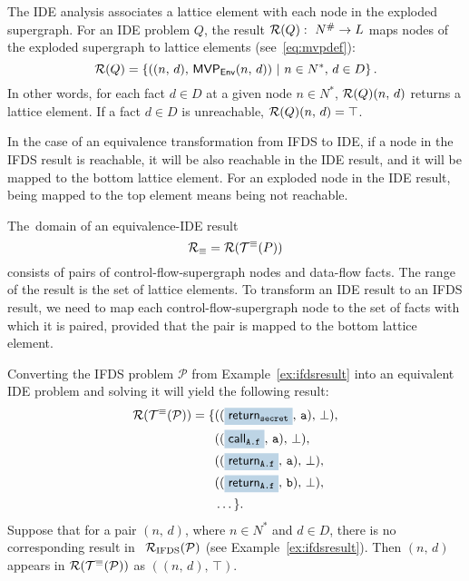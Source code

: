 { The IDE analysis associates a lattice element with each node in the exploded supergraph. For an IDE problem $Q$, the result $\mathcal R(Q):\ N^\#\to L$ maps nodes of the exploded supergraph to lattice elements (see~\eqref{eq:mvpdef}):
\begin{equation}\label{eq:ideresult}
  \mathcal R(Q)=\{((n,\,d),\,\textsf{MVP}_{\textsf{Env}}(n,\,d))\ |\ n\in N^*,\,d\in D\}\,.
\end{equation}
In other words, for each fact $d\in D$ at a given node $n\in N^*$, $\mathcal R(Q)(n,\,d)$ returns a lattice element. If a fact $d\in D$ is unreachable, $\mathcal R(Q)(n,\,d)=\top$.

In the case of an equivalence transformation from IFDS to IDE, if a node in the IFDS result is reachable, it will be also reachable in the IDE result, and it will be mapped to the bottom lattice element. For an exploded node in the IDE result, being mapped to the top element means being not reachable.

The~domain of an equivalence-IDE result 
\begin{equation}
  \mathcal R_\equiv=\mathcal R(\mathcal T^\equiv(P))
\end{equation}
consists of pairs of control-flow-supergraph nodes and data-flow facts. The range of the result is the set of lattice elements. To transform an IDE result to an IFDS result, we need to map each control-flow-supergraph node to the set of facts with which it is paired, provided that the pair is mapped to the bottom lattice element.

\begin{mdelete}
\begin{example}\label{ex:ideresult}
  Converting the IFDS problem $\mathcal P$ from Example~\ref{ex:ifdsresult} into an equivalent IDE problem and solving it will yield the following result:
    \small\begin{align*}
    \result(\transEq(\mathcal P))=\{&((\highlight{\textsf{return}_\texttt{secret}}{greyblue},\,\texttt a),\,\bot),\\
      &((\highlight{\textsf{call}_\texttt{A.f}}{greyblue},\,\texttt a),\,\bot),\\
      &((\highlight{\textsf{return}_\texttt{A.f}}{greyblue},\,\texttt a),\,\bot),\\
      &((\highlight{\textsf{return}_\texttt{A.f}}{greyblue},\,\texttt b),\,\bot),\\
      &\dots\}.\\
    \end{align*}\normalsize
  Suppose that for a pair $(n,\,d)$, where $n\in N^*$ and $d\in D$, there is no corresponding result in ~$\mathcal R_\text{IFDS}(\mathcal P)$ (see Example~\ref{ex:ifdsresult}). Then $(n,\,d)$ appears in $\mathcal R(\mathcal T^\equiv(\mathcal P))$ as $((n,\,d),\,\top)$.
\end{example}
\end{mdelete}

}
